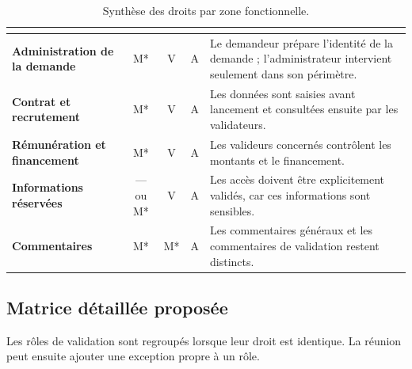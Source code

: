 \begin{table}[htbp]
\centering
\scriptsize
\begin{tabularx}{\textwidth}{>{\bfseries}p{}CCCY}
\toprule
{}
 &  &  &  &  \\
\midrule
Administration de la demande & M* & V & A & Le demandeur prépare l'identité de la demande ; l'administrateur intervient seulement dans son périmètre. \\
Contrat et recrutement & M* & V & A & Les données sont saisies avant lancement et consultées ensuite par les validateurs. \\
Rémunération et financement & M* & V & A & Les valideurs concernés contrôlent les montants et le financement. \\
Informations réservées & — ou M* & V & A & Les accès doivent être explicitement validés, car ces informations sont sensibles. \\
Commentaires & M* & M* & A & Les commentaires généraux et les commentaires de validation restent distincts. \\
\bottomrule
\end{tabularx}
\caption{Synthèse des droits par zone fonctionnelle.}
\label{tab:synthese-zones}
\end{table}

\subsection{Matrice détaillée proposée}

Les rôles de validation sont regroupés lorsque leur droit est identique. La réunion peut ensuite ajouter une exception propre à un rôle.

